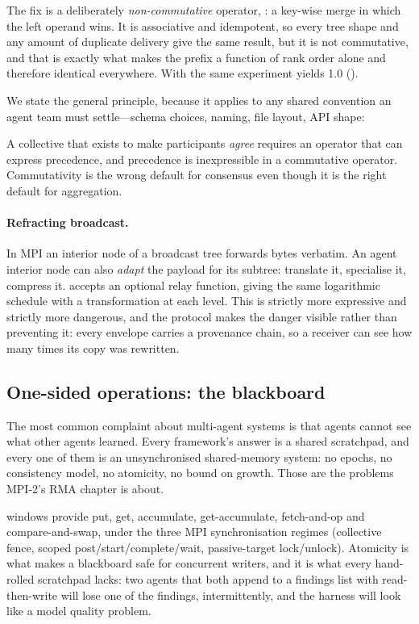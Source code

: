 The fix is a deliberately \emph{non-commutative} operator, : a
key-wise merge in which the left operand wins. It is associative and
idempotent, so every tree shape and any amount of duplicate delivery give
the same result, but it is not commutative, and that is exactly what makes
the prefix a function of rank order alone and therefore identical
everywhere. With  the same experiment yields 1.0
().

We state the general principle, because it applies to any shared convention
an agent team must settle---schema choices, naming, file layout, API shape:

\begin{principle}
A collective that exists to make participants \emph{agree} requires an
operator that can express precedence, and precedence is inexpressible in a
commutative operator. Commutativity is the wrong default for consensus even
though it is the right default for aggregation.
\end{principle}

\paragraph{Refracting broadcast.}
In MPI an interior node of a broadcast tree forwards bytes verbatim. An
agent interior node can also \emph{adapt} the payload for its subtree:
translate it, specialise it, compress it.  accepts an optional
relay function, giving the same logarithmic schedule with a transformation
at each level. This is strictly more expressive and strictly more dangerous,
and the protocol makes the danger visible rather than preventing it: every
envelope carries a provenance chain, so a receiver can see how many times
its copy was rewritten.

\subsection{One-sided operations: the blackboard}
\label{sec:design-rma}

The most common complaint about multi-agent systems is that agents cannot
see what other agents learned. Every framework's answer is a shared
scratchpad, and every one of them is an unsynchronised shared-memory system:
no epochs, no consistency model, no atomicity, no bound on growth. Those are
the problems MPI-2's RMA chapter is about.

\ampi{} windows provide put, get, accumulate, get-accumulate,
fetch-and-op and compare-and-swap, under the three MPI synchronisation
regimes (collective fence, scoped post/start/complete/wait, passive-target
lock/unlock). Atomicity is what makes a blackboard safe for concurrent
writers, and it is what every hand-rolled scratchpad lacks: two agents that
both append to a findings list with read-then-write will lose one of the
findings, intermittently, and the harness will look like a model quality
problem.

